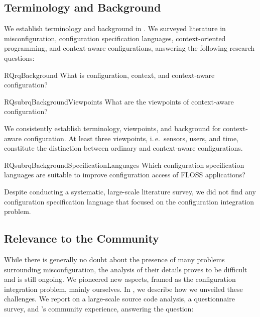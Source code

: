 \subsection{Terminology and Background}

We establish terminology and background in .
We surveyed literature in misconfiguration, configuration specification languages, context-oriented programming, and context-aware configurations, answering the following research questions:

\begin{restatable}{RQ}{rqBackground}
 \label{rq:background}
What is configuration, context, and context-aware configuration?
\end{restatable}

\begin{restatable}{RQsub}{rqBackgroundViewpoints}
 \label{rq:background-viewpoints}
What are the viewpoints of context-aware configuration?
\end{restatable}

\begin{contribution}
We consistently establish terminology, viewpoints, and background for context-aware configuration.
At least three viewpoints, i.\,e.\ sensors, users, and time, constitute the distinction between ordinary and context-aware configurations.
\end{contribution}

\begin{restatable}{RQsub}{rqBackgroundSpecificationLanguages}
 \label{rq:background-specification-languages}
 Which configuration specification languages are suitable to improve configuration access of FLOSS applications?
\end{restatable}

\begin{contribution}
Despite conducting a systematic, large-scale literature survey, we did not find any configuration specification language that focused on the configuration integration problem.
\end{contribution}

\subsection{Relevance to the Community}

While there is generally no doubt about the presence of many problems surrounding misconfiguration, the analysis of their details proves to be difficult and is still ongoing.
We pioneered new aspects, framed as the configuration integration problem, mainly ourselves.
In , we describe how we unveiled these challenges.
We report on a large-scale source code analysis, a questionnaire survey, and \elektra{}'s community experience, answering the question:

